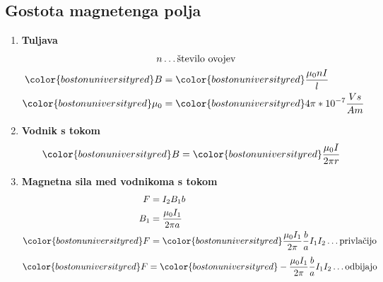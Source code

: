{\color{indiagreen}\subsection{Gostota magnetenga polja}}
\begin{enumerate}
	\item \textbf{Tuljava}\\
		\begin{align*}
			n &\dots \text{število ovojev}\\
			{\color{bostonuniversityred}B} &= {\color{bostonuniversityred}\frac{\mu_0 nI}{l}}\\
			{\color{bostonuniversityred}\mu_0} &= {\color{bostonuniversityred}4\pi * 10^{-7}\frac{Vs}{Am}}\\
		\end{align*}
	\item \textbf{Vodnik s tokom}\\
		\begin{align*}
			{\color{bostonuniversityred}B} &= {\color{bostonuniversityred}\frac{\mu_0 I}{2\pi r}}\\
		\end{align*}
	\item \textbf{Magnetna sila med vodnikoma s tokom}\\
		\begin{align*}
			F &= I_2 B_1 b\\
			B_1 &= \frac{\mu_0 I_1}{2\pi a}\\
			{\color{bostonuniversityred}F} &= {\color{bostonuniversityred}\frac{\mu_0 I_1}{2\pi}\frac{b}{a}I_1I_2} \dots \text{privlačijo}\\
		\end{align*}
		\begin{align*}
			{\color{bostonuniversityred}F} &= {\color{bostonuniversityred}-\frac{\mu_0 I_1}{2\pi}\frac{b}{a}I_1I_2} \dots \text{odbijajo}\\
		\end{align*}
\end{enumerate}
